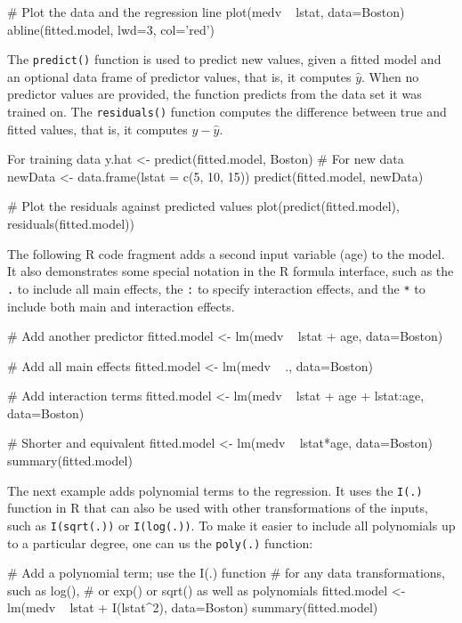 \begin{withcode}
\begin{Rcode}
# Plot the data and the regression line
plot(medv ~ lstat, data=Boston)
abline(fitted.model, lwd=3, col='red')
\end{Rcode}

The \texttt{predict()} function is used to predict new values, given a fitted model and an optional data frame of predictor values, that is, it computes $\hat{y}$. When no predictor values are provided, the function predicts from the data set it was trained on. The \texttt{residuals()} function computes the difference between true and fitted values, that is, it computes $y - \hat{y}$.

\begin{Rcode}
For training data
y.hat <- predict(fitted.model, Boston)
# For new data
newData <- data.frame(lstat = c(5, 10, 15))
predict(fitted.model, newData)

# Plot the residuals against predicted values
plot(predict(fitted.model), residuals(fitted.model))
\end{Rcode}

The following R code fragment adds a second input variable (age) to the model. It also demonstrates some special notation in the R formula interface, such as the \texttt{.} to include all main effects, the \texttt{:} to specify interaction effects, and the \texttt{*} to include both main and interaction effects.

\begin{Rcode}
# Add another predictor
fitted.model <- lm(medv ~ lstat + age, data=Boston)

# Add all main effects
fitted.model <- lm(medv ~ ., data=Boston)

# Add interaction terms
fitted.model <- lm(medv ~ lstat + age + lstat:age, data=Boston)
   
# Shorter and equivalent
fitted.model <- lm(medv ~ lstat*age, data=Boston)
summary(fitted.model)
\end{Rcode}

The next example adds polynomial terms to the regression. It uses the \texttt{I(.)} function in R that can also be used with other transformations of the inputs, such as \texttt{I(sqrt(.))} or \texttt{I(log(.))}. To make it easier to include all polynomials up to a particular degree, one can us the \texttt{poly(.)} function:

\begin{Rcode}
# Add a polynomial term; use the I(.) function
# for any data transformations, such as log(),
# or exp() or sqrt() as well as polynomials
fitted.model <- lm(medv ~ lstat + I(lstat^2), data=Boston)
summary(fitted.model)


\end{Rcode}
\end{withcode}
